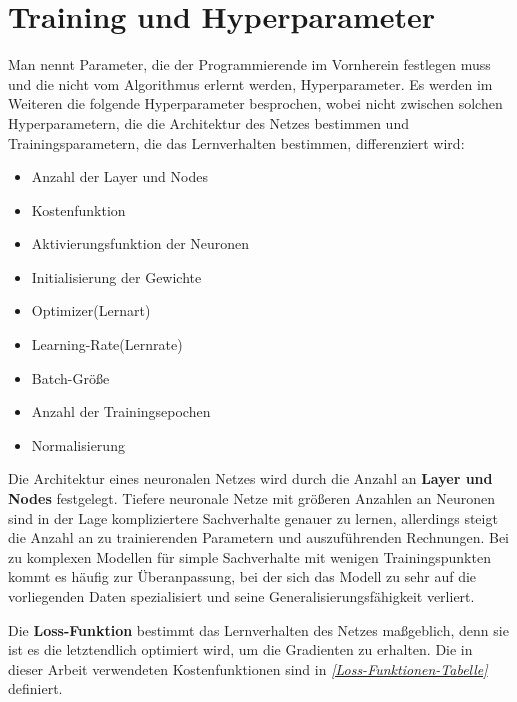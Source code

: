 \section{Training und Hyperparameter}
\label{Training und Hyperparameter}
Man nennt Parameter, die der Programmierende im Vornherein festlegen muss und die nicht vom Algorithmus erlernt werden, Hyperparameter. Es werden im Weiteren die folgende Hyperparameter besprochen, wobei nicht zwischen solchen Hyperparametern, die die Architektur des Netzes bestimmen und Trainingsparametern, die das Lernverhalten bestimmen, differenziert wird:
\begin{multicols}{2}
	\begin{itemize}
	\setlength\itemsep{0cm}
	\setlength{\parskip}{0cm}
		\item Anzahl der Layer und Nodes
		\item Kostenfunktion
		\item Aktivierungsfunktion der Neuronen
		\item Initialisierung der Gewichte
		\item Optimizer(Lernart) 
		\item Learning-Rate(Lernrate)
		\item Batch-Größe
		\item Anzahl der Trainingsepochen
		\item Normalisierung
	\end{itemize}
\end{multicols}
Die Architektur eines neuronalen Netzes wird durch die Anzahl an \textbf{Layer und Nodes} festgelegt.
Tiefere neuronale Netze mit größeren Anzahlen an Neuronen sind in der Lage kompliziertere Sachverhalte genauer zu lernen, allerdings steigt die Anzahl an zu trainierenden Parametern und auszuführenden Rechnungen. Bei zu komplexen Modellen für simple Sachverhalte mit wenigen Trainingspunkten kommt es häufig zur Überanpassung, bei der sich das Modell zu sehr auf die vorliegenden Daten spezialisiert und seine Generalisierungsfähigkeit verliert.

Die \textbf{Loss-Funktion} bestimmt das Lernverhalten des Netzes maßgeblich, denn sie ist es die letztendlich optimiert wird, um die Gradienten zu erhalten. Die in dieser Arbeit verwendeten Kostenfunktionen sind in \textit{\autoref{Loss-Funktionen-Tabelle}} definiert.


